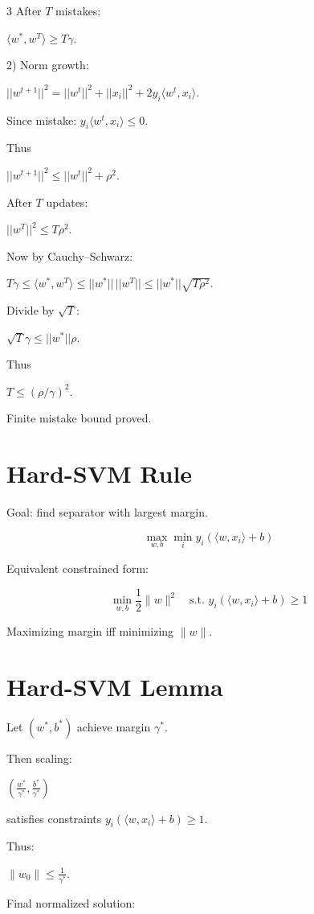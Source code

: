 \documentclass[8pt,fleqn]{extarticle}
\begin{document}
\begin{multicols}{3}
After $T$ mistakes:

$\langle w^*,w^T\rangle \ge T\gamma$.

2) Norm growth:

$||w^{t+1}||^2
=||w^t||^2+||x_i||^2
+2y_i\langle w^t,x_i\rangle$.

Since mistake:
$y_i\langle w^t,x_i\rangle \le 0$.

Thus

$||w^{t+1}||^2 \le ||w^t||^2+\rho^2$.

After $T$ updates:

$||w^T||^2 \le T\rho^2$.

Now by Cauchy--Schwarz:

$T\gamma
\le
\langle w^*,w^T\rangle
\le
||w^*||\,||w^T||
\le
||w^*||\sqrt{T\rho^2}$.

Divide by $\sqrt{T}$:

$\sqrt{T}\gamma \le ||w^*||\rho$.

Thus

$T \le (\rho/\gamma)^2$.

Finite mistake bound proved.


\section*{Hard-SVM Rule}

Goal: find separator with largest margin.

\[
\max_{w,b} \min_i y_i(\langle w,x_i\rangle+b)
\]

Equivalent constrained form:

\[
\min_{w,b} \frac12\|w\|^2
\quad \text{s.t. } y_i(\langle w,x_i\rangle+b)\ge1
\]

Maximizing margin iff minimizing $\|w\|$.

\section*{Hard-SVM Lemma}

Let $(w^*,b^*)$ achieve margin $\gamma^*$.

Then scaling:

$\left(\frac{w^*}{\gamma^*},\frac{b^*}{\gamma^*}\right)$

satisfies constraints $y_i(\langle w,x_i\rangle+b)\ge1$.

Thus:

$\|w_0\|\le \frac1{\gamma^*}$.

Final normalized solution:


\end{multicols}
\end{document}
